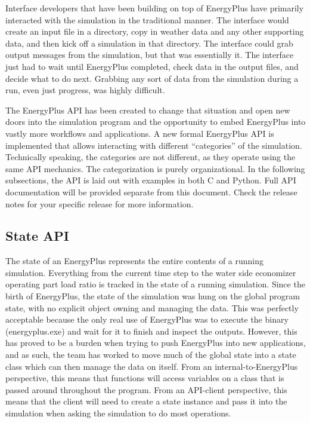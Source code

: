 Interface developers that have been building on top of EnergyPlus have primarily interacted with the simulation in the traditional manner.
The interface would create an input file in a directory, copy in weather data and any other supporting data, and then kick off a simulation in that directory.
The interface could grab output messages from the simulation, but that was essentially it.
The interface just had to wait until EnergyPlus completed, check data in the output files, and decide what to do next.
Grabbing any sort of data from the simulation during a run, even just progress, was highly difficult.

The EnergyPlus API has been created to change that situation and open new doors into the simulation program and the opportunity to embed EnergyPlus into vastly more workflows and applications.
A new formal EnergyPlus API is implemented that allows interacting with different ``categories'' of the simulation.
Technically speaking, the categories are not different, as they operate using the same API mechanics.
The categorization is purely organizational.
In the following subsections, the API is laid out with examples in both C and Python.
Full API documentation will be provided separate from this document.
Check the release notes for your specific release for more information.

\subsection{State API}\label{subsec:state-api}

The state of an EnergyPlus represents the entire contents of a running simulation.
Everything from the current time step to the water side economizer operating part load ratio is tracked in the state of a running simulation.
Since the birth of EnergyPlus, the state of the simulation was hung on the global program state, with no explicit object owning and managing the data.
This was perfectly acceptable because the only real use of EnergyPlus was to execute the binary (energyplus.exe) and wait for it to finish and inspect the outputs.
However, this has proved to be a burden when trying to push EnergyPlus into new applications, and as such, the team has worked to move much of the global state into a state class which can then manage the data on itself.
From an internal-to-EnergyPlus perspective, this means that functions will access variables on a class that is passed around throughout the program.
From an API-client perspective, this means that the client will need to create a state instance and pass it into the simulation when asking the simulation to do most operations.

